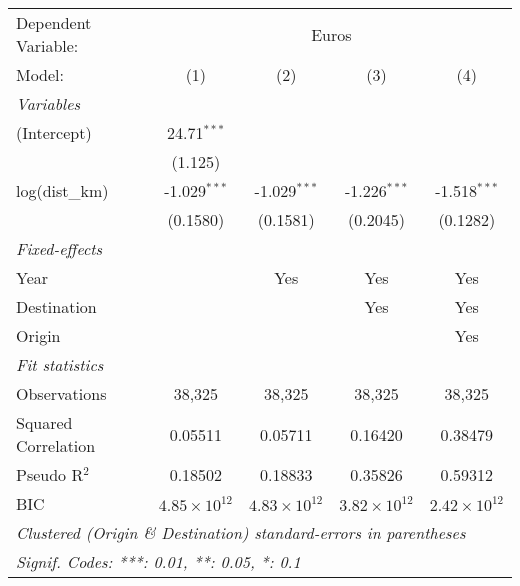 \begingroup
\centering
\begin{tabular}{lcccc}
   \tabularnewline \midrule \midrule
   Dependent Variable: & \multicolumn{4}{c}{Euros}\\
   Model:              & (1)                   & (2)                   & (3)                   & (4)\\  
   \midrule
   \emph{Variables}\\
   (Intercept)         & 24.71$^{***}$         &                       &                       &   \\   
                       & (1.125)               &                       &                       &   \\   
   log(dist\_km)       & -1.029$^{***}$        & -1.029$^{***}$        & -1.226$^{***}$        & -1.518$^{***}$\\   
                       & (0.1580)              & (0.1581)              & (0.2045)              & (0.1282)\\   
   \midrule
   \emph{Fixed-effects}\\
   Year                &                       & Yes                   & Yes                   & Yes\\  
   Destination         &                       &                       & Yes                   & Yes\\  
   Origin              &                       &                       &                       & Yes\\  
   \midrule
   \emph{Fit statistics}\\
   Observations        & 38,325                & 38,325                & 38,325                & 38,325\\  
   Squared Correlation & 0.05511               & 0.05711               & 0.16420               & 0.38479\\  
   Pseudo R$^2$        & 0.18502               & 0.18833               & 0.35826               & 0.59312\\  
   BIC                 & $4.85\times 10^{12}$  & $4.83\times 10^{12}$  & $3.82\times 10^{12}$  & $2.42\times 10^{12}$\\   
   \midrule \midrule
   \multicolumn{5}{l}{\emph{Clustered (Origin \& Destination) standard-errors in parentheses}}\\
   \multicolumn{5}{l}{\emph{Signif. Codes: ***: 0.01, **: 0.05, *: 0.1}}\\
\end{tabular}
\par\endgroup



